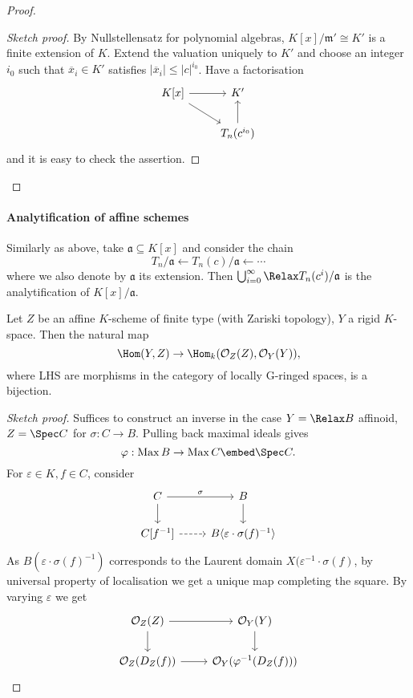 \documentclass[a4paper]{article}
\newcommand{\sh}[1]{\mathcal{#1}} %
\let\Sp\Relax
\DeclareMathOperator{\Sp}{Sp} %
\DeclareMathOperator{\Max}{Max}
\begin{document}
\begin{proof}
  \begin{proof}[Sketch proof]
    By Nullstellensatz for polynomial algebras, \(K[x]/\mathfrak m' \cong K'\) is a finite extension of \(K\). Extend the valuation uniquely to \(K'\) and choose an integer \(i_0\) such that \(\overline x_i \in K'\) satisfies \(|\overline x_i| \leq |c|^{i_0}\). Have a factorisation
    \[
      \begin{tikzcd}
        K[x] \ar[r] \ar[dr] & K' \\
        & T_n(c^{i_0}) \ar[u]
      \end{tikzcd}
    \]
    and it is easy to check the assertion.
  \end{proof}
\end{proof}

\paragraph{Analytification of affine schemes}

Similarly as above, take \(\mathfrak a \subseteq K[x]\) and consider the chain
\[
  T_n/\mathfrak a \leftarrow T_n(c)/\mathfrak a \leftarrow \cdots
\]
where we also denote by \(\mathfrak a\) its extension. Then \(\bigcup_{i = 0}^\infty \Sp T_n(c^i)/\mathfrak a\) is the analytification of \(K[x]/\mathfrak a\).

\begin{lemma}
  Let \(Z\) be an affine \(K\)-scheme of finite type (with Zariski topology), \(Y\) a rigid \(K\)-space. Then the natural map
  \[
    \Hom(Y, Z) \to \Hom_k(\sh O_Z(Z), \sh O_Y(Y)),
  \]
  where LHS are morphisms in the category of locally G-ringed spaces, is a bijection.
\end{lemma}

\begin{proof}[Sketch proof]
  Suffices to construct an inverse in the case \(Y = \Sp B\) affinoid, \(Z = \Spec C\) for \(\sigma: C \to B\). Pulling back maximal ideals gives
  \[
    \varphi: \Max B \to \Max C \embed \Spec C.
  \]
  For \(\varepsilon \in K, f \in C\), consider
  \[
    \begin{tikzcd}
      C \ar[r, "\sigma"] \ar[d] & B \ar[d] \\
      C[f^{-1}] \ar[r, dashed] & B \langle \varepsilon \cdot \sigma(f)^{-1}\rangle
    \end{tikzcd}
  \]
  As \(B(\varepsilon \cdot \sigma(f)^{-1})\) corresponds to the Laurent domain \(X(\varepsilon^{-1} \cdot \sigma(f)\), by universal property of localisation we get a unique map completing the square. By varying \(\varepsilon\) we get
  \[
    \begin{tikzcd}
      \sh O_Z(Z) \ar[r] \ar[d] & \sh O_Y(Y) \ar[d] \\
      \sh O_Z(D_Z(f)) \ar[r] & \sh O_Y(\varphi^{-1}(D_Z(f)))
    \end{tikzcd}
  \]
\end{proof}
\end{document}
